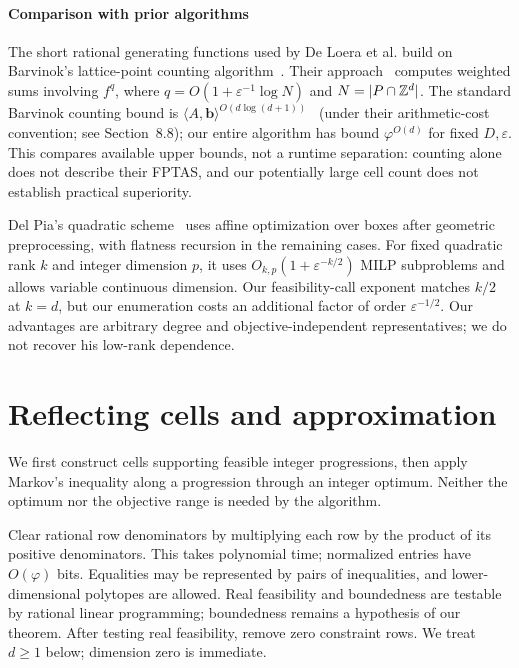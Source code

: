 \documentclass[final,5p,times,twocolumn]{elsarticle}
\theoremstyle{definition}\newtheorem{definition}{Definition}[section]
\theoremstyle{remark}\newtheorem{remark}[theorem]{Remark}
\newcommand{\eps}{\varepsilon}
\begin{document}
\paragraph{Comparison with prior algorithms}

The short rational generating functions used by De Loera et al. build on Barvinok's lattice-point counting algorithm~\cite{Barvinok}. Their approach~\cite{DHKW06,DHKW08} computes weighted sums involving $f^q$, where $q=O(1+\eps^{-1}\log N)$ and $N=|P\cap\mathbb Z^d|$. The standard Barvinok counting bound is $\langle A,\mathbf b\rangle^{O(d\log(d+1))}$~\cite[Theorem~2.5]{PakPanova} (under their arithmetic-cost convention; see Section~8.8); our entire algorithm has bound $\varphi^{O(d)}$ for fixed $D,\eps$. This compares available upper bounds, not a runtime separation: counting alone does not describe their FPTAS, and our potentially large cell count does not establish practical superiority.

Del Pia's quadratic scheme~\cite[Proposition~3 and Section~6.2]{DelPia} uses affine optimization over boxes after geometric preprocessing, with flatness recursion in the remaining cases. For fixed quadratic rank $k$ and integer dimension $p$, it uses $O_{k,p}(1+\eps^{-k/2})$ MILP subproblems and allows variable continuous dimension. Our feasibility-call exponent matches $k/2$ at $k=d$, but our enumeration costs an additional factor of order $\eps^{-1/2}$. Our advantages are arbitrary degree and objective-independent representatives; we do not recover his low-rank dependence.

\section{Reflecting cells and approximation}\label{sec:cover}

We first construct cells supporting feasible integer progressions, then apply Markov's inequality along a progression through an integer optimum. Neither the optimum nor the objective range is needed by the algorithm.

Clear rational row denominators by multiplying each row by the product of its positive denominators. This takes polynomial time; normalized entries have $O(\varphi)$ bits. Equalities may be represented by pairs of inequalities, and lower-dimensional polytopes are allowed. Real feasibility and boundedness are testable by rational linear programming; boundedness remains a hypothesis of our theorem. After testing real feasibility, remove zero constraint rows. We treat $d\ge1$ below; dimension zero is immediate.
\end{document}
